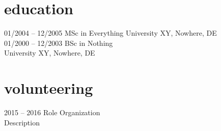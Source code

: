 \documentclass[]{friggeri-minimal-cv}
\begin{document}
\section{education}

\begin{entrylist}
  \monthentry
    {01/2004 -- 12/2005}
    {MSc in Everything }
    {University XY, Nowhere, DE}
    {\\}
  \shortmonthentry
    {01/2000 -- 12/2003}
    {BSc in Nothing}
    {\\University XY, Nowhere, DE}
\end{entrylist}

\section{volunteering}

\begin{entrylist}
  \yearentry
    {2015 -- 2016}
    {Role}
    {Organization}
    {\\Description}
\end{entrylist}
\end{document}
